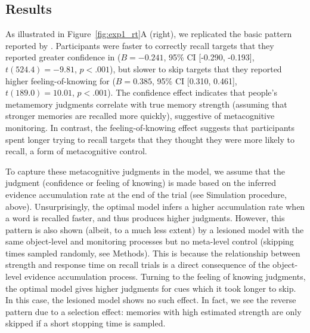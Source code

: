 \subsection{Results}

As illustrated in Figure~\ref{fig:exp1_rt}A (right), we replicated the basic pattern reported by \citet{costermans1992confidence}. Participants were faster to correctly recall targets that they reported greater confidence in ($B = -0.241$, 95\% CI [-0.290, -0.193], $t(524.4)=-9.81$, $p < .001$), but slower to skip targets that they reported higher feeling-of-knowing for ($B = 0.385$, 95\% CI [0.310, 0.461], $t(189.0)=10.01$, $p < .001$). The confidence effect indicates that people's metamemory judgments correlate with true memory strength (assuming that stronger memories are recalled more quickly), suggestive of metacognitive monitoring. In contrast, the feeling-of-knowing effect suggests that participants spent longer trying to recall targets that they thought they were more likely to recall, a form of metacognitive control.

To capture these metacognitive judgments in the model, we assume that the judgment (confidence or feeling of knowing) is made based on the inferred evidence accumulation rate at the end of the trial (see Simulation procedure, above). Unsurprisingly, the optimal model infers a higher accumulation rate when a word is recalled faster, and thus produces higher judgments. However, this pattern is also shown (albeit, to a much less extent) by a lesioned model with the same object-level and monitoring processes but no meta-level control (skipping times sampled randomly, see Methods). This is because the relationship between strength and response time on recall trials is a direct consequence of the object-level evidence accumulation process. Turning to the feeling of knowing judgments, the optimal model gives higher judgments for cues which it took longer to skip. In this case, the lesioned model shows no such effect. In fact, we see the reverse pattern due to a selection effect: memories with high estimated strength are only skipped if a short stopping time is sampled.



